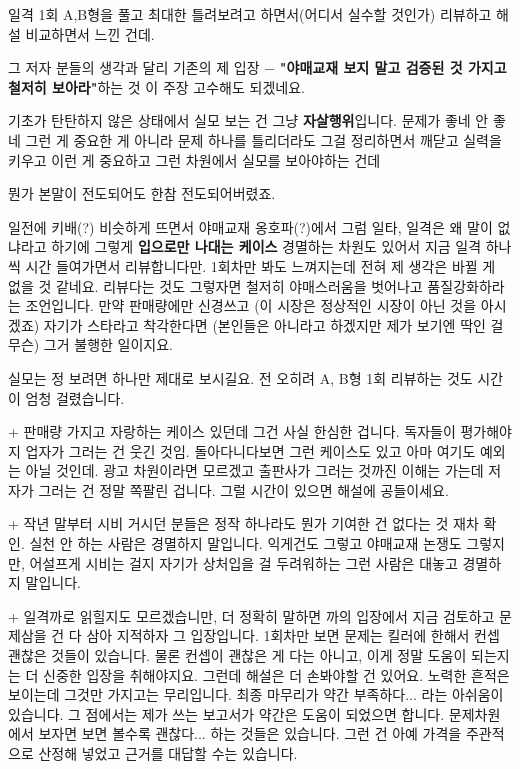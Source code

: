 \vspace{5mm}

일격 1회 A,B형을 풀고 최대한 틀려보려고 하면서(어디서 실수할 것인가) 리뷰하고
해설 비교하면서 느낀 건데.
\vspace{5mm}

그 저자 분들의 생각과 달리 기존의 제 입장 $-$ \textbf{"야매교재 보지 말고 검증된 것 가지고 철저히 보아라"}하는 것
이 주장 고수해도 되겠네요.
\vspace{5mm}

기초가 탄탄하지 않은 상태에서 실모 보는 건 그냥 \textbf{자살행위}입니다.
문제가 좋네 안 좋네 그런 게 중요한 게 아니라
문제 하나를 틀리더라도 그걸 정리하면서 깨닫고 실력을 키우고 이런 게 중요하고
그런 차원에서 실모를 보아야하는 건데
\vspace{5mm}

뭔가 본말이 전도되어도 한참 전도되어버렸죠.
\vspace{5mm}

일전에 키배(?) 비슷하게 뜨면서 야매교재 옹호파(?)에서 그럼 일타, 일격은 왜 말이 없냐라고 하기에
그렇게 \textbf{입으로만 나대는 케이스} 경멸하는 차원도 있어서 지금 일격 하나씩 시간 들여가면서 리뷰합니다만.
1회차만 봐도 느껴지는데 전혀 제 생각은 바뀔 게 없을 것 같네요.
리뷰다는 것도 그렇자면 철저히 야매스러움을 벗어나고 품질강화하라는 조언입니다.
만약 판매량에만 신경쓰고 (이 시장은 정상적인 시장이 아닌 것을 아시겠죠) 자기가 스타라고 착각한다면
(본인들은 아니라고 하겠지만 제가 보기엔 딱인 걸 무슨) 그거 불행한 일이지요.
\vspace{5mm}

실모는 정 보려면 하나만 제대로 보시길요. 전 오히려 A, B형 1회 리뷰하는 것도 시간이 엄청 걸렸습니다.
\vspace{5mm}

+ 판매량 가지고 자랑하는 케이스 있던데 그건 사실 한심한 겁니다. 독자들이 평가해야지 업자가 그러는 건 웃긴 것임.
돌아다니다보면 그런 케이스도 있고 아마 여기도 예외는 아닐 것인데. 광고 차원이라면 모르겠고 출판사가 그러는 것까진 이해는 가는데
저자가 그러는 건 정말 쪽팔린 겁니다. 그럴 시간이 있으면 해설에 공들이세요.
\vspace{5mm}

+ 작년 말부터 시비 거시던 분들은 정작 하나라도 뭔가 기여한 건 없다는 것 재차 확인. 실천 안 하는 사람은 경멸하지 말입니다.
익게건도 그렇고 야매교재 논쟁도 그렇지만, 어설프게 시비는 걸지 자기가 상처입을 걸 두려워하는 그런 사람은 대놓고 경멸하지 말입니다.
\vspace{5mm}

+ 일격까로 읽힐지도 모르겠습니만, 더 정확히 말하면 까의 입장에서 지금 검토하고 문제삼을 건 다 삼아 지적하자 그 입장입니다.
1회차만 보면 문제는 킬러에 한해서 컨셉 괜찮은 것들이 있습니다.
물론 컨셉이 괜찮은 게 다는 아니고, 이게 정말 도움이 되는지는 더 신중한 입장을 취해야지요.
그런데 해설은 더 손봐야할 건 있어요. 노력한 흔적은 보이는데 그것만 가지고는 무리입니다.
최종 마무리가 약간 부족하다... 라는 아쉬움이 있습니다. 그 점에서는 제가 쓰는 보고서가 약간은 도움이 되었으면 합니다.
문제차원에서 보자면 보면 볼수록 괜찮다... 하는 것들은 있습니다. 그런 건 아예 가격을 주관적으로 산정해 넣었고 근거를 대답할 수는 있습니다.
\vspace{5mm}

